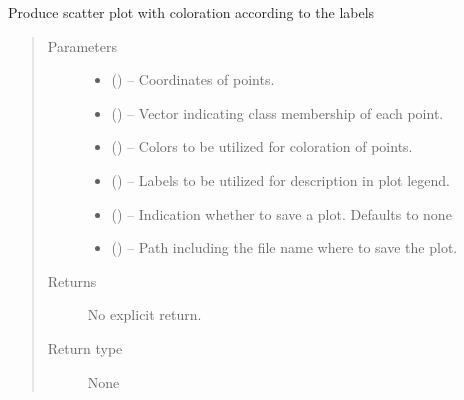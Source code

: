 \documentclass[a4paper,10pt,english]{sphinxmanual}
\begin{document}
\begin{fulllineitems}
\label{\detokenize{api/ucf.scatter_plot_with_groups:ucf.scatter_plot_with_groups}}
Produce scatter plot with coloration according to the labels
\begin{quote}\begin{description}
\item[{Parameters}] \leavevmode\begin{itemize}
\item {} 
 () -- Coordinates of points.

\item {} 
 () -- Vector indicating class membership of each point.

\item {} 
 () -- Colors to be utilized for coloration of points.

\item {} 
 () -- Labels to be utilized for description in plot legend.

\item {} 
 () -- Indication whether to save a plot. Defaults to none

\item {} 
 () -- Path including the file name where to save the plot.

\end{itemize}

\item[{Returns}] \leavevmode
No explicit return.

\item[{Return type}] \leavevmode
None

\end{description}\end{quote}

\end{fulllineitems}
\end{document}
